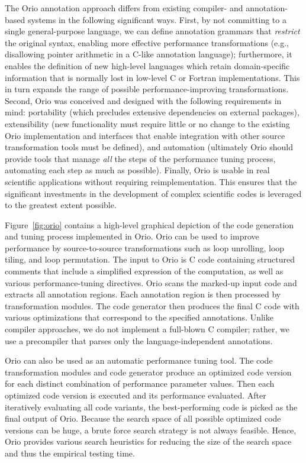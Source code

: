 The Orio annotation approach differs from existing compiler- and
annotation-based systems in the following significant ways.
%
First, by not committing to a single general-purpose language, we can define 
annotation grammars that \emph{restrict} the original syntax, enabling more
effective performance transformations (e.g., disallowing pointer arithmetic
in a C-like annotation language); furthermore, it enables the definition of
new high-level languages which retain domain-specific
information that is normally lost in low-level C or Fortran
implementations. This in turn expands the range of possible performance-improving 
transformations.
%
Second, Orio was conceived and designed with the following requirements in mind: 
portability (which precludes extensive dependencies on external packages),
extensibility (new functionality must require little or no change to the
existing Orio implementation and interfaces that enable integration with
other source transformation tools must be defined), and automation
(ultimately Orio should provide tools that manage
\emph{all} the steps of the performance tuning process, automating each step 
as much as possible).
%
Finally, Orio is usable in real scientific applications without
requiring reimplementation. This ensures that the significant investments in
the development of complex scientific codes is leveraged to the greatest
extent possible.

Figure~\ref{fig:orio} contains a high-level graphical depiction of the code
generation and tuning process implemented in Orio.  Orio can be used to
improve performance by source-to-source transformations such as loop
unrolling, loop tiling, and loop permutation. The input to Orio is C code
containing structured comments that include a simplified expression of the
computation, as well as various performance-tuning directives. Orio scans the
marked-up input code and extracts all annotation regions. Each annotation
region is then processed by transformation modules. The code generator then
produces the final C code with various optimizations that correspond to the
specified annotations. Unlike compiler approaches, we do not implement a
full-blown C compiler; rather, we use a precompiler that parses only the
language-independent annotations.

Orio can also be used as an automatic performance tuning tool.  The code
transformation modules and code generator produce an optimized code version
for each distinct combination of performance parameter values. Then each
optimized code version is executed and its performance evaluated.  After
iteratively evaluating all code variants, the best-performing code is picked
as the final output of Orio. Because the search space of all possible
optimized code versions can be huge, a brute force search strategy is not
always feasible. Hence, Orio provides various search heuristics for reducing
the size of the search space and thus the empirical testing time.

